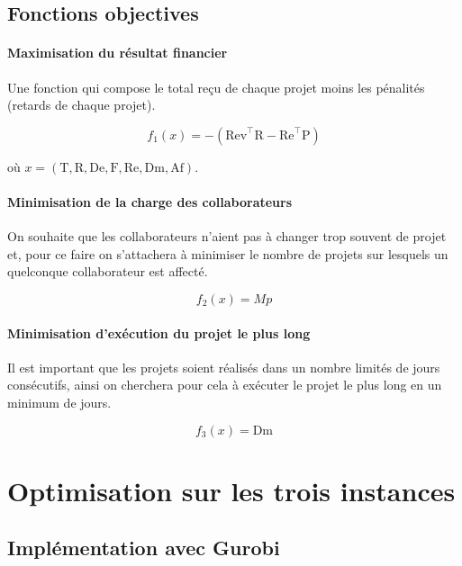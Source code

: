 \documentclass[12pt, a4paper, french, version=last, parskip=half, titlepage]{scrartcl}
\begin{document}
\subsection{Fonctions objectives}

\paragraph{Maximisation du résultat financier}
Une fonction qui compose le total reçu de chaque projet moins les pénalités (retards de chaque projet).

\begin{equation*}
    f_1(x) = - (\text{Rev}^{\intercal}\text{R} - \text{Re}^{\intercal}\text{P})
\end{equation*}

où $x = (\text{T}, \text{R}, \text{De}, \text{F}, \text{Re}, \text{Dm}, \text{Af})$.

\paragraph{Minimisation de la charge des collaborateurs} On souhaite que les collaborateurs n’aient pas à changer trop souvent de projet et, pour ce faire on s’attachera à minimiser le nombre de projets sur lesquels un quelconque collaborateur est affecté.

\begin{equation*}
    f_2(x) = Mp
\end{equation*}

\paragraph{Minimisation d'exécution du projet le plus long} Il est important que les projets soient réalisés dans un nombre limités de jours consécutifs, ainsi on cherchera pour cela à exécuter le projet le plus long en un minimum de jours. 

\begin{equation*}
    f_3(x) = \text{Dm}
\end{equation*}


\section{Optimisation sur les trois instances}

\subsection{Implémentation avec Gurobi}
\end{document}
